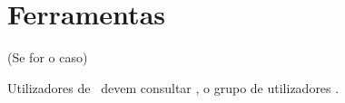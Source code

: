 \chapter{Ferramentas}
(Se for o caso)

Utilizadores de \Latex\ devem consultar \TUG,
o grupo de utilizadores \tug{\TeX}.